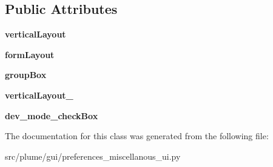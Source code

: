 \subsection*{Public Attributes}
\begin{DoxyCompactItemize}
\item 
{\bfseries vertical\+Layout}\hypertarget{classplume-creator_1_1src_1_1plume_1_1gui_1_1preferences__miscellanous__ui_1_1_ui___miscellanous_page_a074f90caaca41e4403c6e927a688cbfb}{}\label{classplume-creator_1_1src_1_1plume_1_1gui_1_1preferences__miscellanous__ui_1_1_ui___miscellanous_page_a074f90caaca41e4403c6e927a688cbfb}

\item 
{\bfseries form\+Layout}\hypertarget{classplume-creator_1_1src_1_1plume_1_1gui_1_1preferences__miscellanous__ui_1_1_ui___miscellanous_page_a4d078de40c0feb777f8fd08c6e391514}{}\label{classplume-creator_1_1src_1_1plume_1_1gui_1_1preferences__miscellanous__ui_1_1_ui___miscellanous_page_a4d078de40c0feb777f8fd08c6e391514}

\item 
{\bfseries group\+Box}\hypertarget{classplume-creator_1_1src_1_1plume_1_1gui_1_1preferences__miscellanous__ui_1_1_ui___miscellanous_page_ad4acae3570598bc8f39b74e304485fe6}{}\label{classplume-creator_1_1src_1_1plume_1_1gui_1_1preferences__miscellanous__ui_1_1_ui___miscellanous_page_ad4acae3570598bc8f39b74e304485fe6}

\item 
{\bfseries vertical\+Layout\+\_}\hypertarget{classplume-creator_1_1src_1_1plume_1_1gui_1_1preferences__miscellanous__ui_1_1_ui___miscellanous_page_ad4ad4f70c3596d926c278bc9753d0835}{}\label{classplume-creator_1_1src_1_1plume_1_1gui_1_1preferences__miscellanous__ui_1_1_ui___miscellanous_page_ad4ad4f70c3596d926c278bc9753d0835}

\item 
{\bfseries dev\+\_\+mode\+\_\+check\+Box}\hypertarget{classplume-creator_1_1src_1_1plume_1_1gui_1_1preferences__miscellanous__ui_1_1_ui___miscellanous_page_aa6cff79392cbcec700f3272e9517963f}{}\label{classplume-creator_1_1src_1_1plume_1_1gui_1_1preferences__miscellanous__ui_1_1_ui___miscellanous_page_aa6cff79392cbcec700f3272e9517963f}

\end{DoxyCompactItemize}


The documentation for this class was generated from the following file\+:\begin{DoxyCompactItemize}
\item 
src/plume/gui/preferences\+\_\+miscellanous\+\_\+ui.\+py\end{DoxyCompactItemize}
